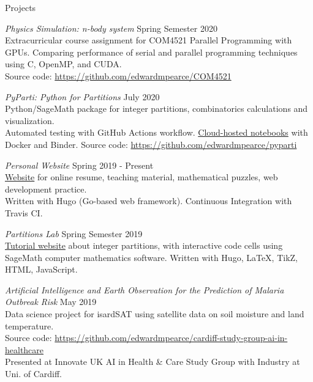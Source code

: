 \documentclass{resume} %
\begin{document}
\begin{rSection}{Projects}

{\em Physics Simulation: n-body system} \hfill Spring Semester 2020 \\
Extracurricular course assignment for COM4521 Parallel Programming with GPUs. Comparing performance of serial and parallel programming techniques using C, OpenMP, and CUDA.\\
Source code: \href{https://github.com/edwardmpearce/COM4521}{https://github.com/edwardmpearce/COM4521}

{\em PyParti: Python for Partitions} \hfill July 2020 \\
Python/SageMath package for integer partitions, combinatorics calculations and visualization. \\
Automated testing with GitHub Actions workflow.
\href{https://mybinder.org/v2/gh/edwardmpearce/pyparti/master}{Cloud-hosted notebooks} with Docker and Binder.
Source code: \href{https://github.com/edwardmpearce/pyparti}{https://github.com/edwardmpearce/pyparti}


{\em Personal Website} \hfill Spring 2019 - Present \\
\href{https://edwardmpearce.github.io/}{Website} for online resume, teaching material, mathematical puzzles, web development practice.\\
Written with Hugo (Go-based web framework). Continuous Integration with Travis CI.

{\em Partitions Lab} \hfill Spring Semester 2019 \\
\href{https://edwardmpearce.github.io/tutorial-partitions/}{Tutorial website} about integer partitions, with interactive code cells using SageMath computer mathematics software.
Written with Hugo, LaTeX, TikZ, HTML, JavaScript.

{\em Artificial Intelligence and Earth Observation for the Prediction of Malaria Outbreak Risk} \hfill May 2019 \\
Data science project for isardSAT using satellite data on soil moisture and land temperature. \\
Source code: \href{https://github.com/edwardmpearce/cardiff-study-group-ai-in-healthcare}{https://github.com/edwardmpearce/cardiff-study-group-ai-in-healthcare}\\
Presented at Innovate UK AI in Health \& Care Study Group with Industry at Uni. of Cardiff.


\end{rSection}
\end{document}

